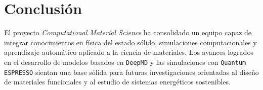 \documentclass[10pt]{article}
\begin{document}
\section*{Conclusión}

El proyecto \textit{Computational Material Science} ha consolidado un equipo capaz de integrar conocimientos en física del estado sólido, simulaciones computacionales y aprendizaje automático aplicado a la ciencia de materiales. 
Los avances logrados en el desarrollo de modelos basados en \texttt{DeepMD} y las simulaciones con \texttt{Quantum ESPRESSO} sientan una base sólida para futuras investigaciones orientadas al diseño de materiales funcionales y al estudio de sistemas energéticos sostenibles.
\end{document}
